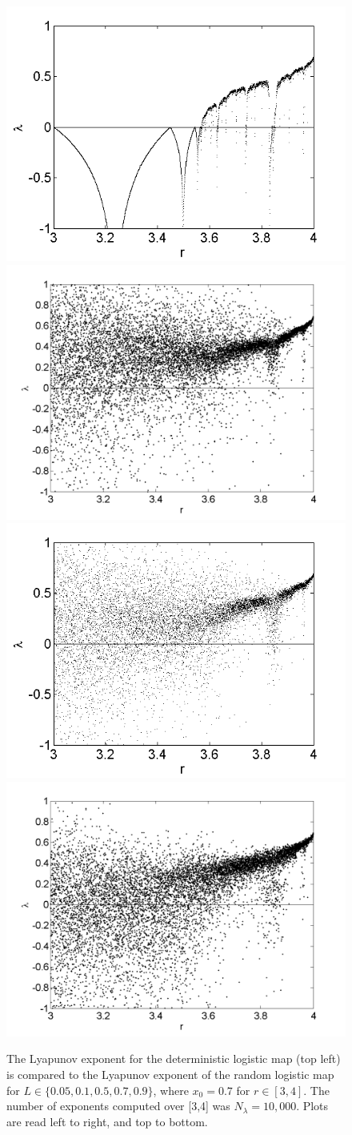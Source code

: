\begin{figure}[!h]
\caption[Lyapunov exponent in the random logistic map compared to the
deterministic map]{The Lyapunov exponent for the deterministic
  logistic map (top left) is compared
  to the Lyapunov exponent of the random logistic map for $L \in \{0.05,0.1,0.5,0.7,0.9\}$, where $x_0=0.7$ for $r \in [3,4]$. The number of exponents computed over
  [3,4] was $N_\lambda=10,000$. Plots are read left to right, and top
  to bottom. }\label{fig:rloglyap2}
\centering
\includegraphics[width=.5\textwidth]{figs/det_log_lyap.png}\hfill
\includegraphics[width=.5\textwidth]{figs/rlog_lyap_L_005.png}\\
\includegraphics[width=.5\textwidth]{figs/rlog_lyap_L01_zoom.png}\hfill
\includegraphics[width=.5\textwidth]{figs/rlog_lyap_L_05.png}\\

\end{figure}

